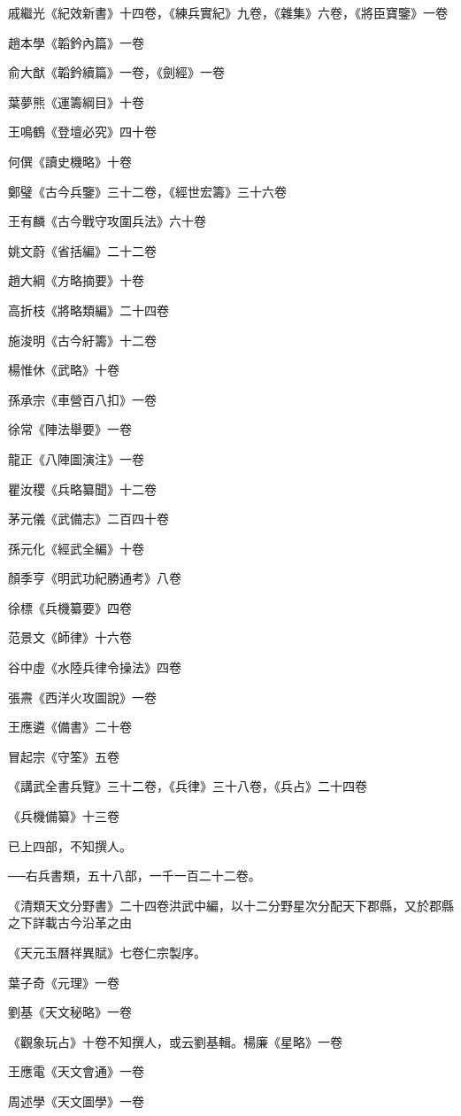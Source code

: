 戚繼光《紀效新書》十四卷，《練兵實紀》九卷，《雜集》六卷，《將臣寶鑒》一卷

趙本學《韜鈐內篇》一卷

俞大猷《韜鈐續篇》一卷，《劍經》一卷

葉夢熊《運籌綱目》十卷

王鳴鶴《登壇必究》四十卷

何僎《讀史機略》十卷

鄭璧《古今兵鑒》三十二卷，《經世宏籌》三十六卷

王有麟《古今戰守攻圍兵法》六十卷

姚文蔚《省括編》二十二卷

趙大綱《方略摘要》十卷

高折枝《將略類編》二十四卷

施浚明《古今紆籌》十二卷

楊惟休《武略》十卷

孫承宗《車營百八扣》一卷

徐常《陣法舉要》一卷

龍正《八陣圖演注》一卷

瞿汝稷《兵略纂聞》十二卷

茅元儀《武備志》二百四十卷

孫元化《經武全編》十卷

顏季亨《明武功紀勝通考》八卷

徐標《兵機纂要》四卷

范景文《師律》十六卷

谷中虛《水陸兵律令操法》四卷

張燾《西洋火攻圖說》一卷

王應遴《備書》二十卷

冒起宗《守筌》五卷

《講武全書兵覽》三十二卷，《兵律》三十八卷，《兵占》二十四卷

《兵機備纂》十三卷

已上四部，不知撰人。

──右兵書類，五十八部，一千一百二十二卷。

《清類天文分野書》二十四卷洪武中編，以十二分野星次分配天下郡縣，又於郡縣之下詳載古今沿革之由

《天元玉曆祥異賦》七卷仁宗製序。

葉子奇《元理》一卷

劉基《天文秘略》一卷

《觀象玩占》十卷不知撰人，或云劉基輯。楊廉《星略》一卷

王應電《天文會通》一卷

周述學《天文圖學》一卷

